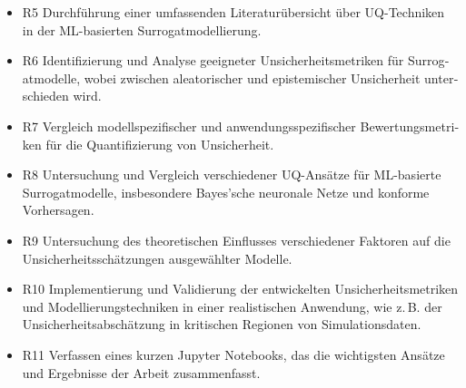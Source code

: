 \begin{otherlanguage}{ngerman}
\begin{itemize}
  \item {R5} Durchführung einer umfassenden Literaturübersicht über UQ-Techniken in der ML-basierten Surrogatmodellierung.
  \item {R6} Identifizierung und Analyse geeigneter Unsicherheitsmetriken für Surrogatmodelle, wobei zwischen aleatorischer und epistemischer Unsicherheit unterschieden wird.
  \item {R7} Vergleich modellspezifischer und anwendungsspezifischer Bewertungsmetriken für die Quantifizierung von Unsicherheit.
  \item {R8} Untersuchung und Vergleich verschiedener UQ-Ansätze für ML-basierte Surrogatmodelle, insbesondere Bayes'sche neuronale Netze und konforme Vorhersagen.
  \item {R9} Untersuchung des theoretischen Einflusses verschiedener Faktoren auf die Unsicherheitsschätzungen ausgewählter Modelle.
  \item {R10} Implementierung und Validierung der entwickelten Unsicherheitsmetriken und Modellierungstechniken in einer realistischen Anwendung, wie z.\,B. der Unsicherheitsabschätzung in kritischen Regionen von Simulationsdaten.
  \item {R11} Verfassen eines kurzen Jupyter Notebooks, das die wichtigsten Ansätze und Ergebnisse der Arbeit zusammenfasst.
\end{itemize}
\end{otherlanguage}








